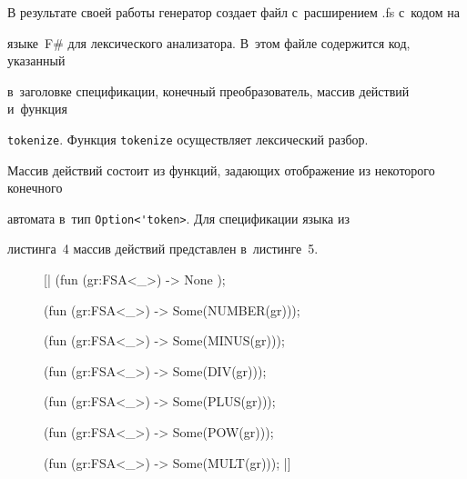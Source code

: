 В результате своей работы генератор создает файл с~расширением .fs с~кодом на 


языке~F\# для лексического анализатора. В~этом файле содержится код, указанный 


в~заголовке спецификации, конечный преобразователь, массив действий и~функция 


\verb"tokenize". Функция \verb"tokenize" осуществляет лексический разбор.  


Массив действий состоит из функций, задающих отображение из некоторого конечного 


автомата в~тип \verb"Option<'token>". Для спецификации языка из 


листинга~4 массив действий представлен в~листинге~5.





\begin{figure} %


\vspace*{6pt}


\begin{center}


\begin{boxedverbatim}


[| (fun (gr:FSA<_>) -> None );


   (fun (gr:FSA<_>) -> Some(NUMBER(gr)));


   (fun (gr:FSA<_>) -> Some(MINUS(gr)));


   (fun (gr:FSA<_>) -> Some(DIV(gr)));


   (fun (gr:FSA<_>) -> Some(PLUS(gr)));


   (fun (gr:FSA<_>) -> Some(POW(gr)));


   (fun (gr:FSA<_>) -> Some(MULT(gr))); |]


\end{boxedverbatim}


\end{center}


\vspace*{-6pt}




\vspace*{-6pt}


\end{figure}





\vspace*{-4pt}





